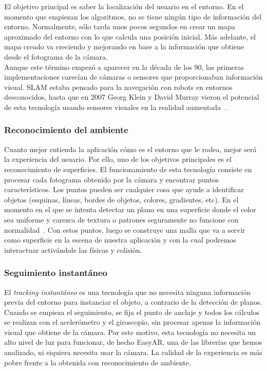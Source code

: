 El objetivo principal es saber la localización del usuario en el entorno. En el momento que empiezan los algoritmos, no se tiene ningún tipo de información del entorno. Normalmente, sólo tarda unos pocos segundos en crear un mapa aproximado del entorno con lo que calcula una posición inicial. Más adelante, el mapa creado va creciendo y mejorando en base a la información que obtiene desde el fotograma de la cámara.\\

Aunque este término empezó a aparecer en la década de los 90, las primeras implementaciones carecían de cámaras o sensores que proporcionaban información visual. SLAM estaba pensado para la navegación con robots en entornos desconocidos, hasta que en 2007 Georg Klein y David Murray vieron el potencial de esta tecnología usando sensores visuales en la realidad aumentada~\cite{MaxstMedium}.

\subsubsection{Reconocimiento del ambiente}
Cuanto mejor entienda la aplicación cómo es el entorno que le rodea, mejor será la experiencia del usuario. Por ello, uno de los objetivos principales es el reconocimiento de superficies. El funcionamiento de esta tecnología consiste en procesar cada fotograma obtenido por la cámara y encontrar puntos característicos. Los puntos pueden ser cualquier cosa que ayude a identificar objetos (esquinas, líneas, bordes de objetos, colores, gradientes, etc). En el momento en el que se intenta detectar un plano en una superficie donde el color sea uniforme y carezca de textura o patrones seguramente no funcione con normalidad~\cite{ARCoreConcepts}. Con estos puntos, luego se construye una malla que va a servir como superficie en la escena de nuestra aplicación y con la cual podremos interactuar activándole las físicas y colisión.

\subsubsection{Seguimiento instantáneo}
 El \textit{tracking instantáneo} es una tecnología que no necesita ninguna información previa del entorno para instanciar el objeto, a contrario de la detección de planos. Cuando se empieza el seguimiento, se fija el punto de anclaje y todos los cálculos se realizan con el acelerómetro y el giroscopio, sin procesar apenas la información visual que obtiene de la cámara. Por este motivo, esta tecnología no necesita un alto nivel de luz para funcionar, de hecho EasyAR, una de las librerías que hemos analizado, ni siquiera necesita usar la cámara. La calidad de la experiencia es más pobre frente a la obtenida con reconocimiento de ambiente. 

